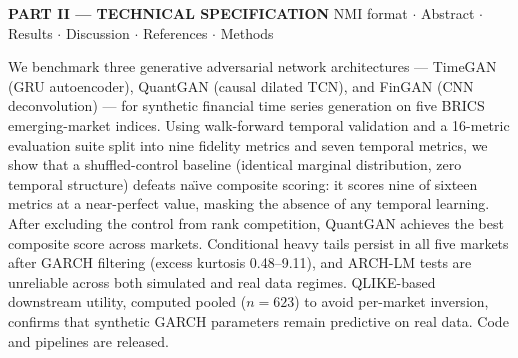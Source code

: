 \documentclass[10pt]{article}
\begin{document}
\clearpage



\begin{tcolorbox}[enhanced,arc=0pt,outer arc=0pt,boxrule=0pt,
  colback=Navy!10,colframe=Navy!10,top=3pt,bottom=3pt,left=8pt,right=8pt,
  before skip=0pt,after skip=6pt]
{\large\bfseries\color{Navy} PART II --- TECHNICAL SPECIFICATION}
\hfill{\small\color{Navy!70} NMI format $\cdot$ Abstract $\cdot$ Results $\cdot$ Discussion $\cdot$ References $\cdot$ Methods}
\end{tcolorbox}

\begin{tcolorbox}[enhanced,arc=4pt,boxrule=1pt,colframe=Navy,colback=LBg,
  top=6pt,bottom=6pt,left=8pt,right=8pt,before skip=2pt,after skip=8pt,
  title={\bfseries Abstract --- $\leq$150 words, unreferenced}]
\small
We benchmark three generative adversarial network architectures --- TimeGAN (GRU autoencoder), QuantGAN (causal dilated TCN), and FinGAN (CNN deconvolution) --- for synthetic financial time series generation on five BRICS emerging-market indices. Using walk-forward temporal validation and a 16-metric evaluation suite split into nine fidelity metrics and seven temporal metrics, we show that a shuffled-control baseline (identical marginal distribution, zero temporal structure) defeats na\"{\i}ve composite scoring: it scores nine of sixteen metrics at a near-perfect value, masking the absence of any temporal learning. After excluding the control from rank competition, QuantGAN achieves the best composite score across markets. Conditional heavy tails persist in all five markets after GARCH filtering (excess kurtosis 0.48--9.11), and ARCH-LM tests are unreliable across both simulated and real data regimes. QLIKE-based downstream utility, computed pooled ($n=623$) to avoid per-market inversion, confirms that synthetic GARCH parameters remain predictive on real data. Code and pipelines are released.
\end{tcolorbox}
\end{document}
